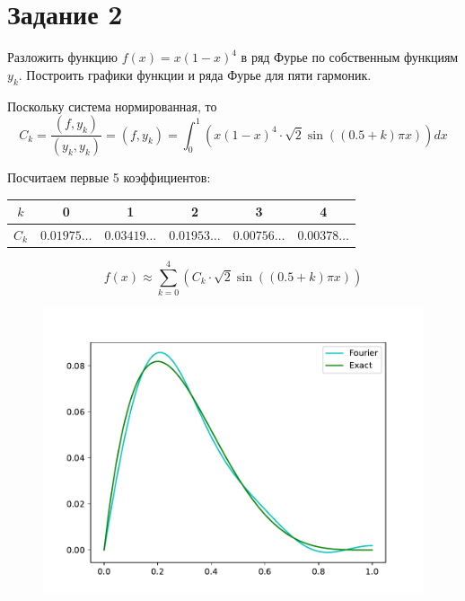 \section*{Задание 2}
    Разложить функцию $ f(x) = x (1-x) ^4 $ в ряд Фурье по собственным функциям $ y_k $. Построить графики функции и ряда Фурье для пяти гармоник.

    Поскольку система нормированная, то
    \[ C_k = \frac{(f, y_k)}{(y_k, y_k)} = (f, y_k) = \int_0^1 \left( x (1-x) ^4 \cdot \sqrt{2} \sin \left( (0.5 + k) \pi x \right) \right) dx \]

    Посчитаем первые 5 коэффициентов:

    \begin{center}

        \begin{tabular}{|c|c|c|c|c|c|}
            \hline
            $ k $ & 0 & 1 & 2 & 3 & 4 \\
            \hline
            $ C_k $& $0.01975 \dots$& $0.03419 \dots$ & $0.01953 \dots$ & $0.00756 \dots$ & $0.00378 \dots$\\
            \hline
        \end{tabular}

    \end{center}
    \[
        f(x) \approx \sum_{k=0}^4 \left( C_k \cdot \sqrt{2} \sin \left( (0.5 + k) \pi x \right) \right)
    \]
    \begin{figure}[H]
        \centering
        \includegraphics[width=14cm]{fourier.pdf}
    \end{figure}
